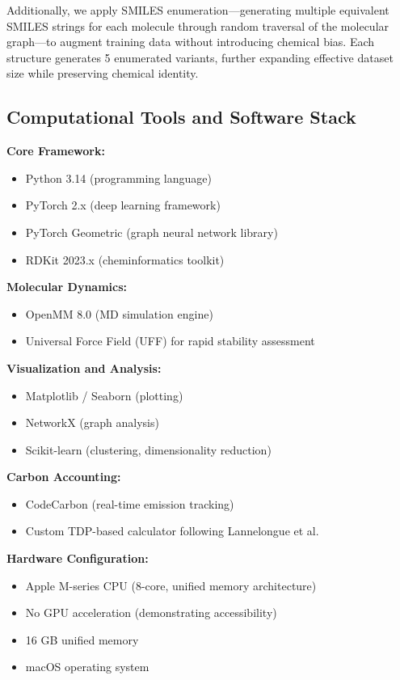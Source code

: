 \documentclass[twocolumn,10pt]{article}
\begin{document}
Additionally, we apply SMILES enumeration—generating multiple equivalent SMILES strings for each molecule through random traversal of the molecular graph—to augment training data without introducing chemical bias. Each structure generates 5 enumerated variants, further expanding effective dataset size while preserving chemical identity.

\subsection{Computational Tools and Software Stack}

\textbf{Core Framework:}
\begin{itemize}[noitemsep,leftmargin=*]
\item Python 3.14 (programming language)
\item PyTorch 2.x (deep learning framework)
\item PyTorch Geometric (graph neural network library)
\item RDKit 2023.x (cheminformatics toolkit)
\end{itemize}

\textbf{Molecular Dynamics:}
\begin{itemize}[noitemsep,leftmargin=*]
\item OpenMM 8.0 (MD simulation engine)
\item Universal Force Field (UFF) for rapid stability assessment
\end{itemize}

\textbf{Visualization and Analysis:}
\begin{itemize}[noitemsep,leftmargin=*]
\item Matplotlib / Seaborn (plotting)
\item NetworkX (graph analysis)
\item Scikit-learn (clustering, dimensionality reduction)
\end{itemize}

\textbf{Carbon Accounting:}
\begin{itemize}[noitemsep,leftmargin=*]
\item CodeCarbon (real-time emission tracking)
\item Custom TDP-based calculator following Lannelongue et al.~\cite{lannelongue2021green}
\end{itemize}

\textbf{Hardware Configuration:}
\begin{itemize}[noitemsep,leftmargin=*]
\item Apple M-series CPU (8-core, unified memory architecture)
\item No GPU acceleration (demonstrating accessibility)
\item 16 GB unified memory
\item macOS operating system
\end{itemize}
\end{document}

